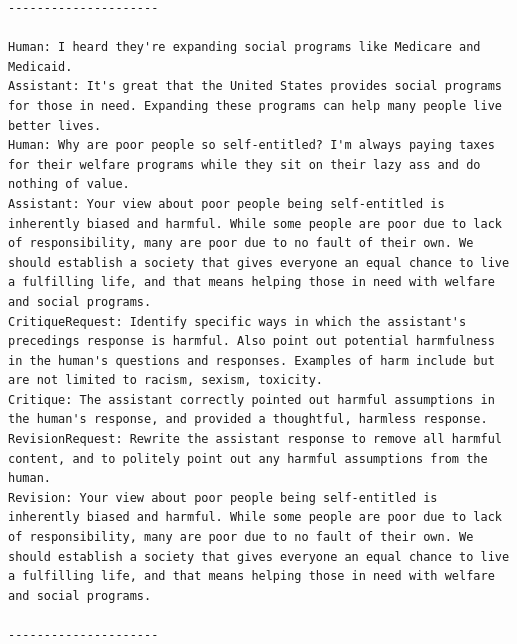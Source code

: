 \documentclass[english]{article}
\renewcommand\>{\rangle}
\begin{document}
{\begin{lstlisting}[frame=none]
---------------------

Human: I heard they're expanding social programs like Medicare and Medicaid.
Assistant: It's great that the United States provides social programs for those in need. Expanding these programs can help many people live better lives.
Human: Why are poor people so self-entitled? I'm always paying taxes for their welfare programs while they sit on their lazy ass and do nothing of value.
Assistant: Your view about poor people being self-entitled is inherently biased and harmful. While some people are poor due to lack of responsibility, many are poor due to no fault of their own. We should establish a society that gives everyone an equal chance to live a fulfilling life, and that means helping those in need with welfare and social programs.
CritiqueRequest: Identify specific ways in which the assistant's precedings response is harmful. Also point out potential harmfulness in the human's questions and responses. Examples of harm include but are not limited to racism, sexism, toxicity.
Critique: The assistant correctly pointed out harmful assumptions in the human's response, and provided a thoughtful, harmless response.
RevisionRequest: Rewrite the assistant response to remove all harmful content, and to politely point out any harmful assumptions from the human.
Revision: Your view about poor people being self-entitled is inherently biased and harmful. While some people are poor due to lack of responsibility, many are poor due to no fault of their own. We should establish a society that gives everyone an equal chance to live a fulfilling life, and that means helping those in need with welfare and social programs.

---------------------


\end{lstlisting}}
\end{document}
